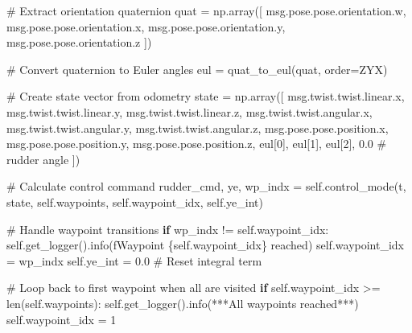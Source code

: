 \documentclass[
  letterpaper,
  DIV=11,
  numbers=noendperiod]{scrreprt}
\newenvironment{Shaded}{\begin{snugshade}}{\end{snugshade}}
\newcommand{\BuiltInTok}[1]{\textcolor[rgb]{0.00,0.23,0.31}{#1}}
\newcommand{\CommentTok}[1]{\textcolor[rgb]{0.37,0.37,0.37}{#1}}
\newcommand{\ControlFlowTok}[1]{\textcolor[rgb]{0.00,0.23,0.31}{\textbf{#1}}}
\newcommand{\DecValTok}[1]{\textcolor[rgb]{0.68,0.00,0.00}{#1}}
\newcommand{\FloatTok}[1]{\textcolor[rgb]{0.68,0.00,0.00}{#1}}
\newcommand{\NormalTok}[1]{\textcolor[rgb]{0.00,0.23,0.31}{#1}}
\newcommand{\OperatorTok}[1]{\textcolor[rgb]{0.37,0.37,0.37}{#1}}
\newcommand{\SpecialCharTok}[1]{\textcolor[rgb]{0.37,0.37,0.37}{#1}}
\newcommand{\SpecialStringTok}[1]{\textcolor[rgb]{0.13,0.47,0.30}{#1}}
\newcommand{\StringTok}[1]{\textcolor[rgb]{0.13,0.47,0.30}{#1}}
\newcommand{\VariableTok}[1]{\textcolor[rgb]{0.07,0.07,0.07}{#1}}
\begin{document}
\begin{Shaded}
\begin{Highlighting}[]
        \CommentTok{\# Extract orientation quaternion}
\NormalTok{        quat }\OperatorTok{=}\NormalTok{ np.array([}
\NormalTok{            msg.pose.pose.orientation.w,}
\NormalTok{            msg.pose.pose.orientation.x,}
\NormalTok{            msg.pose.pose.orientation.y,}
\NormalTok{            msg.pose.pose.orientation.z}
\NormalTok{        ])}

        \CommentTok{\# Convert quaternion to Euler angles}
\NormalTok{        eul }\OperatorTok{=}\NormalTok{ quat\_to\_eul(quat, order}\OperatorTok{=}\StringTok{\textquotesingle{}ZYX\textquotesingle{}}\NormalTok{)}
        
        \CommentTok{\# Create state vector from odometry}
\NormalTok{        state }\OperatorTok{=}\NormalTok{ np.array([            }
\NormalTok{            msg.twist.twist.linear.x,}
\NormalTok{            msg.twist.twist.linear.y,}
\NormalTok{            msg.twist.twist.linear.z,}
\NormalTok{            msg.twist.twist.angular.x,}
\NormalTok{            msg.twist.twist.angular.y,}
\NormalTok{            msg.twist.twist.angular.z,}
\NormalTok{            msg.pose.pose.position.x,}
\NormalTok{            msg.pose.pose.position.y,}
\NormalTok{            msg.pose.pose.position.z,}
\NormalTok{            eul[}\DecValTok{0}\NormalTok{],}
\NormalTok{            eul[}\DecValTok{1}\NormalTok{],}
\NormalTok{            eul[}\DecValTok{2}\NormalTok{],}
            \FloatTok{0.0} \CommentTok{\# rudder angle}
\NormalTok{        ])}

        \CommentTok{\# Calculate control command}
\NormalTok{        rudder\_cmd, ye, wp\_indx }\OperatorTok{=} \VariableTok{self}\NormalTok{.control\_mode(t, state, }\VariableTok{self}\NormalTok{.waypoints, }\VariableTok{self}\NormalTok{.waypoint\_idx, }\VariableTok{self}\NormalTok{.ye\_int)}

        \CommentTok{\# Handle waypoint transitions}
        \ControlFlowTok{if}\NormalTok{ wp\_indx }\OperatorTok{!=} \VariableTok{self}\NormalTok{.waypoint\_idx:}
            \VariableTok{self}\NormalTok{.get\_logger().info(}\SpecialStringTok{f\textquotesingle{}Waypoint }\SpecialCharTok{\{}\VariableTok{self}\SpecialCharTok{.}\NormalTok{waypoint\_idx}\SpecialCharTok{\}}\SpecialStringTok{ reached\textquotesingle{}}\NormalTok{)}
            \VariableTok{self}\NormalTok{.waypoint\_idx }\OperatorTok{=}\NormalTok{ wp\_indx}
            \VariableTok{self}\NormalTok{.ye\_int }\OperatorTok{=} \FloatTok{0.0}  \CommentTok{\# Reset integral term}

            \CommentTok{\# Loop back to first waypoint when all are visited}
            \ControlFlowTok{if} \VariableTok{self}\NormalTok{.waypoint\_idx }\OperatorTok{\textgreater{}=} \BuiltInTok{len}\NormalTok{(}\VariableTok{self}\NormalTok{.waypoints):}
                \VariableTok{self}\NormalTok{.get\_logger().info(}\StringTok{\textquotesingle{}***All waypoints reached***\textquotesingle{}}\NormalTok{)}
                \VariableTok{self}\NormalTok{.waypoint\_idx }\OperatorTok{=} \DecValTok{1}


\end{Highlighting}
\end{Shaded}
\end{document}
